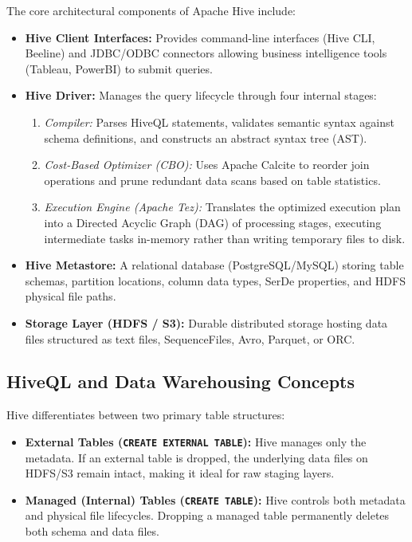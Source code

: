 \documentclass[12pt,a4paper]{report}
\begin{document}
The core architectural components of Apache Hive include:
\begin{itemize}
    \item \textbf{Hive Client Interfaces:} Provides command-line interfaces (Hive CLI, Beeline) and JDBC/ODBC connectors allowing business intelligence tools (Tableau, PowerBI) to submit queries.
    \item \textbf{Hive Driver:} Manages the query lifecycle through four internal stages:
    \begin{enumerate}
        \item \textit{Compiler:} Parses HiveQL statements, validates semantic syntax against schema definitions, and constructs an abstract syntax tree (AST).
        \item \textit{Cost-Based Optimizer (CBO):} Uses Apache Calcite to reorder join operations and prune redundant data scans based on table statistics.
        \item \textit{Execution Engine (Apache Tez):} Translates the optimized execution plan into a Directed Acyclic Graph (DAG) of processing stages, executing intermediate tasks in-memory rather than writing temporary files to disk.
    \end{enumerate}
    \item \textbf{Hive Metastore:} A relational database (PostgreSQL/MySQL) storing table schemas, partition locations, column data types, SerDe properties, and HDFS physical file paths.
    \item \textbf{Storage Layer (HDFS / S3):} Durable distributed storage hosting data files structured as text files, SequenceFiles, Avro, Parquet, or ORC.
\end{itemize}

\subsection{HiveQL and Data Warehousing Concepts}
Hive differentiates between two primary table structures:
\begin{itemize}
    \item \textbf{External Tables (\texttt{CREATE EXTERNAL TABLE}):} Hive manages only the metadata. If an external table is dropped, the underlying data files on HDFS/S3 remain intact, making it ideal for raw staging layers.
    \item \textbf{Managed (Internal) Tables (\texttt{CREATE TABLE}):} Hive controls both metadata and physical file lifecycles. Dropping a managed table permanently deletes both schema and data files.
\end{itemize}
\end{document}
